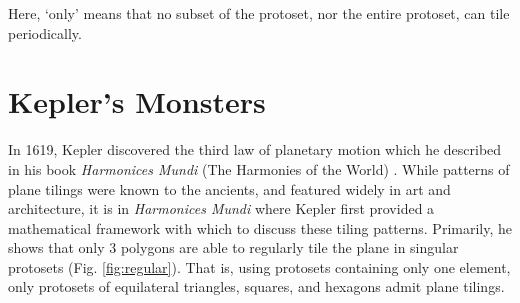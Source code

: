 \documentclass[
  oneside,
  11pt, a4paper,
  footinclude=true,
  headinclude=true,
  cleardoublepage=empty
]{scrbook}
\begin{document}
Here, `only' means that no subset of the protoset, nor the entire protoset, can tile periodically. 


\section{Kepler's Monsters} 
In 1619, Kepler discovered the third law of planetary motion which he described in his book \textit{Harmonices Mundi} (The Harmonies of the World) \cite{Kepler1997}. While patterns of plane tilings were known to the ancients, and featured widely in art and architecture, it is in \textit{Harmonices Mundi} where Kepler first provided a mathematical framework with which to discuss these tiling patterns. Primarily, he shows that only 3 polygons are able to regularly tile the plane in singular protosets (Fig. \ref{fig:regular}). That is, using protosets containing only one element, only protosets of equilateral triangles, squares, and hexagons admit plane tilings. 
\end{document}
